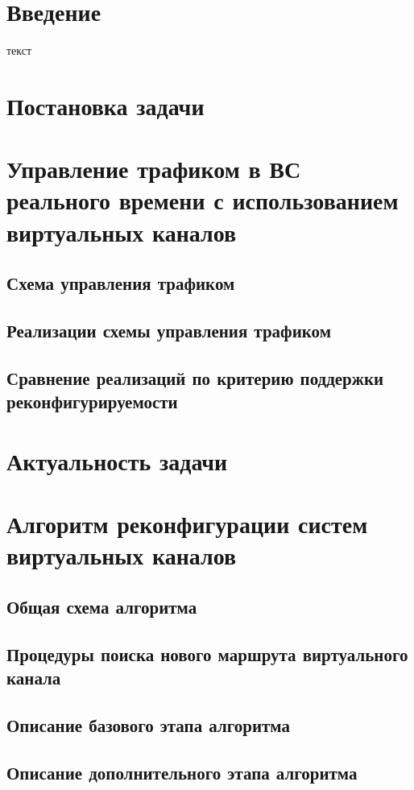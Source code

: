 \documentclass[12pt,fleqn]{article}
\begin{document}
\section*{Введение}
текст

\section{Постановка задачи}


\section{Управление трафиком в ВС реального времени с использованием виртуальных каналов}
\subsection{Схема управления трафиком}
\subsection{Реализации схемы управления трафиком}
\subsection{Сравнение реализаций по критерию поддержки реконфигурируемости}


\section{Актуальность задачи}


\section{Алгоритм реконфигурации систем виртуальных каналов}
\subsection{Общая схема алгоритма}
\subsection{Процедуры поиска нового маршрута виртуального канала}
\subsection{Описание базового этапа алгоритма}
\subsection{Описание дополнительного этапа алгоритма}
\end{document}
